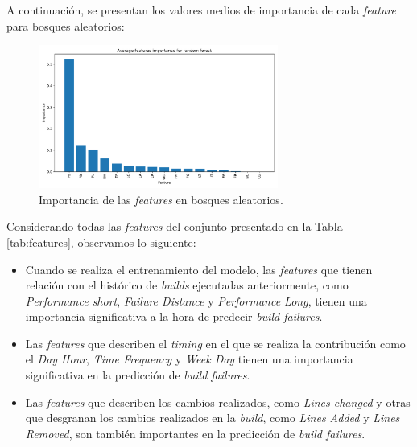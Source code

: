 \noindent A continuación, se presentan los valores medios de importancia de cada \textit{feature}
para bosques aleatorios:

\begin{figure}[H]
    \centering
    \includegraphics[width=0.7\textwidth]{images/Average features importance for random forest.pdf}
    \caption{Importancia de las \textit{features} en bosques aleatorios.}
    \label{fig:random_forest_feature_importance}
\end{figure}

\noindent Considerando todas las \textit{features} del conjunto presentado en la Tabla \ref{tab:features},
observamos lo siguiente:

\begin{itemize}
    \item Cuando se realiza el entrenamiento del modelo, las \textit{features} que tienen relación
    con el histórico de \textit{builds} ejecutadas anteriormente, como \textit{Performance short},
    \textit{Failure Distance} y \textit{Performance Long}, tienen una importancia significativa
    a la hora de predecir \textit{build failures}.\\

    \item Las \textit{features} que describen el \textit{timing} en el que se realiza la
    contribución como el \textit{Day Hour}, \textit{Time Frequency} y \textit{Week Day} tienen
    una importancia significativa en la predicción de \textit{build failures}.\\

    \item Las \textit{features} que describen los cambios realizados, como \textit{Lines changed}
    y otras que desgranan los cambios realizados en la \textit{build}, como \textit{Lines Added}
    y \textit{Lines Removed}, son también importantes en la predicción de \textit{build failures}.
\end{itemize}

